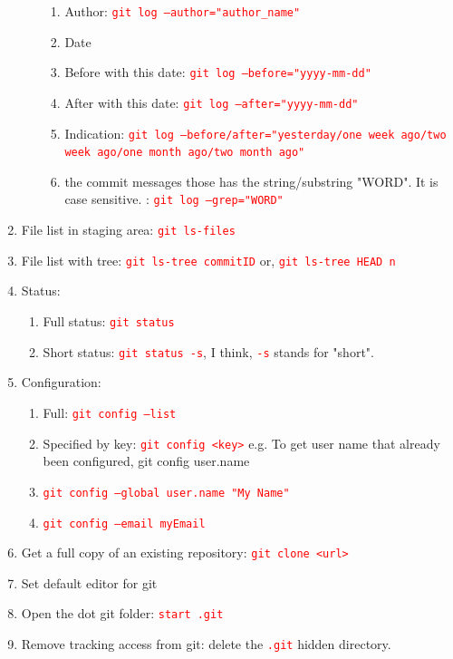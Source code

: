 \documentclass[12 pt, letterpaper]{extarticle}
\newcommand{\R}{\textcolor{red}} %
\newcommand{\T}{\texttt}
\begin{document}
\begin{enumerate}
\begin{enumerate}
\begin{enumerate}
					\item Author: \R{\T{git log --author="author\_name"}}
					\item Date
					\item Before with this date: \R{\T{git log --before="yyyy-mm-dd"}}
					\item After with this date: \R{\T{git log --after="yyyy-mm-dd"}}
					\item Indication: \R{\T{git log --before/after="yesterday/one week ago/two week ago/one month ago/two month ago"}}
					\item the commit messages those has the string/substring "WORD". It is case sensitive. : \R{\T{git log --grep="WORD"}}
				\end{enumerate}
		\end{enumerate}
	\item File list in staging area: \R{\T{git ls-files}}
	\item File list with tree: \R{\T{git ls-tree commitID}}	or, \R{\T{git ls-tree HEAD~n}}
	
	\item Status:
		\begin{enumerate}
			\item Full status: \R{\T{git status}}
			\item Short status: \R{\T{git status -s}}, I think, \R{\T{-s}} stands for "short".
		\end{enumerate}
		
	\item Configuration:
		\begin{enumerate}
			\item Full: \R{\T{git config --list}}
			\item Specified by key: \R{\T{git config <key>}} e.g. To get user name that already been configured, \textcolor{red!70}{{git config user.name}}
			\item \R{\T{git config --global user.name "My Name"}}
			\item \R{\T{git config --email myEmail}}
		\end{enumerate}
	\item Get a full copy of an existing repository: \R{\T{git clone <url>}}
	
	\item Set default editor for git
	\item Open the dot git folder: \R{\T{start .git}}
	\item Remove tracking access from git: delete the \R{\T{.git}} hidden directory.
	

\end{enumerate}
\end{document}
